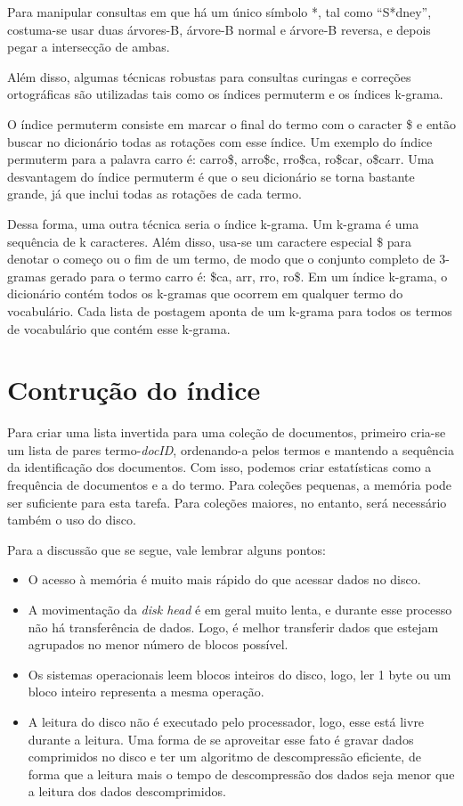   Para manipular consultas em que há um único símbolo *, tal como ``S*dney'', costuma-se usar duas árvores-B, árvore-B normal e árvore-B reversa, e depois pegar a intersecção de ambas.    

  Além disso, algumas técnicas robustas para consultas curingas e correções ortográficas são utilizadas tais como os índices permuterm e os índices k-grama. 
    
  O índice permuterm consiste em marcar o final do termo com o caracter \$ e então buscar no dicionário todas as rotações com esse índice. Um exemplo do índice permuterm para a palavra carro é:  carro\$, arro\$c, rro\$ca, ro\$car, o\$carr. Uma desvantagem do índice permuterm é que o seu dicionário se torna bastante grande, já que inclui todas as rotações de cada termo. 
    
  Dessa forma, uma outra técnica seria o índice k-grama. Um k-grama é uma sequência de k caracteres. Além disso, usa-se um caractere especial \$ para denotar o começo ou o fim de um termo, de modo que o conjunto completo de 3-gramas gerado para o termo carro é: \$ca, arr, rro, ro\$. Em um índice k-grama, o dicionário contém todos os k-gramas que ocorrem em qualquer termo do  vocabulário. Cada lista de postagem aponta de um k-grama para todos os termos de vocabulário que contém esse k-grama.

\section{Contrução do índice}
\label{sec:construcao_indice}

Para criar uma lista invertida para uma coleção de documentos, primeiro cria-se um lista de pares termo-\emph{docID}, ordenando-a pelos termos e mantendo a sequência da identificação dos documentos. Com isso, podemos criar estatísticas como a frequência de documentos e a do termo. Para coleções pequenas, a memória pode ser suficiente para esta tarefa. Para coleções maiores, no entanto, será necessário também o uso do disco.

Para a discussão que se segue, vale lembrar alguns pontos:
\begin{itemize}
\item O acesso à memória é muito mais rápido do que acessar dados no disco.
\item A movimentação da \emph{disk head} é em geral muito lenta, e durante esse processo não há transferência de dados. Logo, é melhor transferir dados que estejam agrupados no menor número de blocos possível.
\item Os sistemas operacionais leem blocos inteiros do disco, logo, ler 1 byte ou um bloco inteiro representa a mesma operação.
\item A leitura do disco não é executado pelo processador, logo, esse está livre durante a leitura. Uma forma de se aproveitar esse fato é gravar dados comprimidos no disco e ter um algoritmo de descompressão eficiente, de forma que a leitura mais o tempo de descompressão dos dados seja menor que a leitura dos dados descomprimidos.
\end{itemize}

